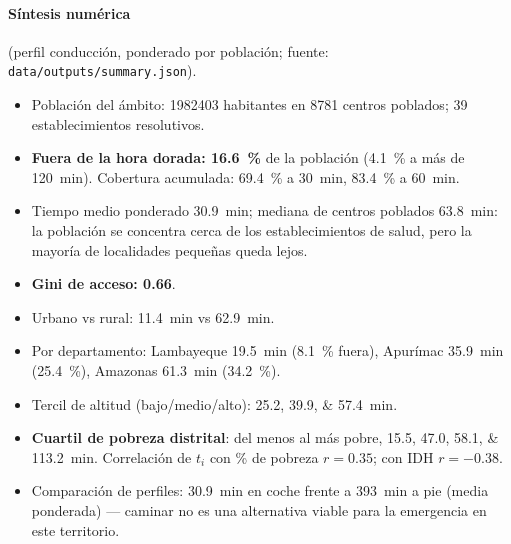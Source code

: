\documentclass[11pt,a4paper]{article}
\begin{document}
\paragraph{S\'intesis num\'erica} (perfil conducci\'on, ponderado por poblaci\'on;
fuente: \texttt{data/outputs/summary.json}).
\begin{itemize}
  \item Poblaci\'on del \'ambito: \num{1982403} habitantes en \num{8781} centros
        poblados; \num{39} establecimientos resolutivos.
  \item \textbf{Fuera de la hora dorada: \SI{16.6}{\percent}} de la poblaci\'on
        (\SI{4.1}{\percent} a m\'as de \num{120}~min). Cobertura acumulada:
        \SI{69.4}{\percent} a \num{30}~min, \SI{83.4}{\percent} a \num{60}~min.
  \item Tiempo medio ponderado \num{30.9}~min; mediana de centros poblados
        \num{63.8}~min: la poblaci\'on se concentra cerca de los establecimientos de salud,
        pero la mayor\'ia de localidades peque\~nas queda lejos.
  \item \textbf{Gini de acceso: \num{0.66}}.
  \item Urbano vs rural: \num{11.4}~min vs \num{62.9}~min.
  \item Por departamento: Lambayeque \num{19.5}~min (\SI{8.1}{\percent} fuera),
        Apur\'imac \num{35.9}~min (\SI{25.4}{\percent}), Amazonas
        \num{61.3}~min (\SI{34.2}{\percent}).
  \item Tercil de altitud (bajo/medio/alto): \numlist{25.2;39.9;57.4}~min.
  \item \textbf{Cuartil de pobreza distrital}: del menos al m\'as pobre,
        \numlist{15.5;47.0;58.1;113.2}~min. Correlaci\'on de $t_i$ con \% de
        pobreza $r=\num{0.35}$; con IDH $r=\num{-0.38}$.
  \item Comparaci\'on de perfiles: \num{30.9}~min en coche frente a
        \num{393}~min a pie (media ponderada) --- caminar no es una alternativa
        viable para la emergencia en este territorio.
\end{itemize}
\end{document}
